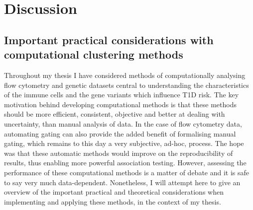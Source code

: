 \chapter{Discussion}


\section{ Important practical considerations with computational clustering methods }

Throughout my thesis I have considered methods of computationally analysing flow cytometry and genetic datasets central to understanding the characteristics of the immune cells and the gene variants which influence \gls{T1D} risk.
The key motivation behind developing computational methods is that these methods should be more efficient, consistent, objective and better at dealing with uncertainty, than manual analysis of data.
In the case of flow cytometry data, automating gating can also provide the added benefit of formalising manual gating, which remains to this day a very subjective, ad-hoc, process.
The hope was that these automatic methods would improve on the reproducibility of results, thus enabling more powerful association testing.
However, assessing the performance of these computational methods is a matter of debate and it is safe to say very much data-dependent.
Nonetheless, I will attempt here to give an overview of the important practical and theoretical considerations when implementing and applying these methods, in the context of my thesis.


